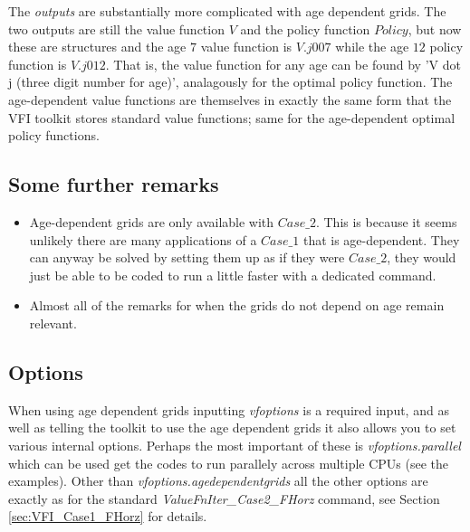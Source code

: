 The \textit{outputs} are substantially more complicated with age dependent grids. The two outputs are still the value function $V$ and the policy function $Policy$, but now these are structures and the age $7$ value function is $V.j007$ while the age $12$ policy function is $V.j012$. That is, the value function for any age can be found by 'V dot j (three digit number for age)', analagously for the optimal policy function. The age-dependent value functions are themselves in exactly the same form that the VFI toolkit stores standard value functions; same for the age-dependent optimal policy functions.

\subsection{Some further remarks}
\begin{itemize}
 \item Age-dependent grids are only available with $Case\_{}2$. This is because it seems unlikely there are many applications of a $Case\_{}1$ that is age-dependent. They can anyway be solved by setting them up as if they were $Case\_{}2$, they would just be able to be coded to run a little faster with a dedicated command.
 \item Almost all of the remarks for when the grids do not depend on age remain relevant.
\end{itemize}

\subsection{Options}
When using age dependent grids inputting \textit{vfoptions} is a required input, and as well as telling the toolkit to use the age dependent grids it also allows you to set various internal options. Perhaps the most important of these is \textit{vfoptions.parallel} which can be used get the codes to run parallely across multiple CPUs (see the examples). Other than \textit{vfoptions.agedependentgrids} all the other options are exactly as for the standard \textit{ValueFnIter\_{}Case2\_{}FHorz} command, see Section \ref{sec:VFI_Case1_FHorz} for details.


